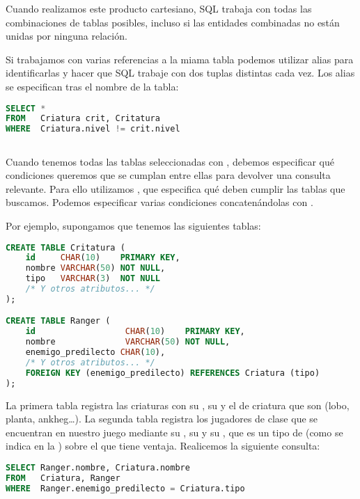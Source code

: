 Cuando realizamos este producto cartesiano, SQL trabaja con todas las combinaciones de tablas posibles, incluso si las entidades combinadas no están unidas por ninguna relación.

Si trabajamos con varias referencias a la miama tabla podemos utilizar alias para identificarlas y hacer que SQL trabaje con dos tuplas distintas cada vez.
Los alias se especifican tras el nombre de la tabla:

\begin{lstlisting}[language=SQL]
SELECT *
FROM   Criatura crit, Critatura
WHERE  Criatura.nivel != crit.nivel
\end{lstlisting}

\subsection{}

Cuando tenemos todas las tablas seleccionadas con , debemos especificar qué condiciones queremos que se cumplan entre ellas para devolver una consulta relevante.
Para ello utilizamos , que especifica qué  deben cumplir las tablas que buscamos.
Podemos especificar varias condiciones concatenándolas con .

Por ejemplo, supongamos que tenemos las siguientes tablas:

\begin{lstlisting}[language=SQL]
CREATE TABLE Critatura (
	id     CHAR(10)    PRIMARY KEY,
	nombre VARCHAR(50) NOT NULL,
	tipo   VARCHAR(3)  NOT NULL
	/* Y otros atributos... */
);

CREATE TABLE Ranger (
	id                  CHAR(10)    PRIMARY KEY,
	nombre              VARCHAR(50) NOT NULL,
	enemigo_predilecto CHAR(10),
	/* Y otros atributos... */
	FOREIGN KEY (enemigo_predilecto) REFERENCES Criatura (tipo)
);
\end{lstlisting}

La primera tabla registra las criaturas con su , su  y el  de criatura que son (lobo, planta, ankheg\ldots).
La segunda tabla registra los jugadores de clase  que se encuentran en nuestro juego mediante su , su  y su , que es un tipo de  (como se indica en la ) sobre el que tiene ventaja.
Realicemos la siguiente consulta:

\begin{lstlisting}[language=SQL]
SELECT Ranger.nombre, Criatura.nombre
FROM   Criatura, Ranger
WHERE  Ranger.enemigo_predilecto = Criatura.tipo
\end{lstlisting}


